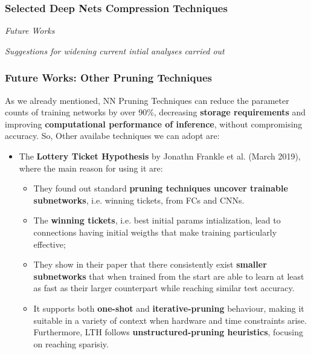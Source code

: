 
\begin{frame}
    \frametitle{Selected Deep Nets Compression Techniques}
        \begin{center}
            {\fontsize{40}{50}\selectfont \emph{Future Works}}
        \end{center}
        \begin{center}
            \emph{Suggestions for widening current intial analyses carried out}
        \end{center}
\end{frame}


\begin{frame}
    \frametitle{Future Works: Other Pruning Techniques}
    As we already mentioned, NN Pruning Techniques can reduce the parameter counts of training networks by over 90\%, decreasing \textbf{storage requirements}
    and improving \textbf{computational performance of inference}, without compromising accuracy. So, Other availabe techniques we can adopt are:
    \begin{itemize}
        \item The \textbf{Lottery Ticket Hypothesis} by Jonathn Frankle et al. (March 2019), where the main reason for using it are:
        \begin{itemize}
            \item They found out standard \textbf{pruning techniques uncover trainable subnetworks}, i.e. winning tickets, from FCs and CNNs.
            \item The \textbf{winning tickets}, i.e. best initial params intialization, lead to connections having initial weigths that make training particularly effective;
            \item They show in their paper that there consistently exist \textbf{smaller subnetworks} that when trained from the start are able to learn at least as fast as their
            larger counterpart while reaching similar test accuracy.
            \item It supports both \textbf{one-shot} and \textbf{iterative-pruning} behaviour, making it suitable in a variety of context when hardware and time constraints arise. Furthermore, LTH follows \textbf{unstructured-pruning heuristics}, focusing on reaching sparisiy.
        \end{itemize}
        
    \end{itemize}
\end{frame}
